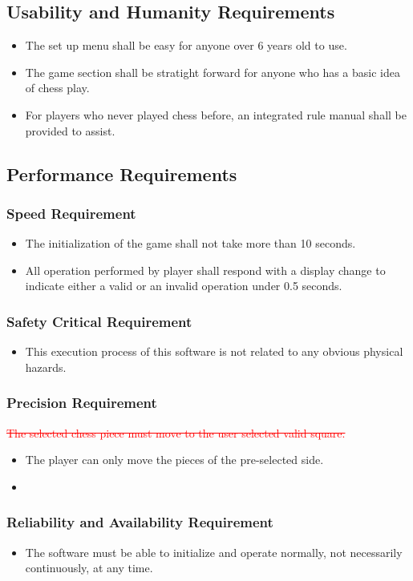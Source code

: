 \documentclass[12pt, titlepage]{article}
\begin{document}
\subsection{Usability and Humanity Requirements}
\begin{itemize}
\item The set up menu shall be easy for anyone over 6 years old to use.
\item The game section shall be stratight forward for anyone who has a basic idea of chess play.
\item For players who never played chess before, an integrated rule manual shall be provided to assist.
\end{itemize}
\subsection{Performance Requirements}
\subsubsection{Speed Requirement}
\begin{itemize}
\item The initialization of the game shall not take more than 10 seconds.
\item All operation performed by player shall respond with a display change to indicate either a valid or an invalid operation under 0.5 seconds.
\end{itemize}
\subsubsection{Safety Critical Requirement}
\begin{itemize}
\item This execution process of this software is not related to any obvious physical hazards.
\end{itemize}
\subsubsection{Precision Requirement}
\textcolor{red}{
\sout{The selected chess piece must move to the user selected valid square.}}
\begin{itemize}
\item The player can only move the pieces of the pre-selected side.
\item \color{red}{The mouse-click input should equivalent to the visual platform.}
\end{itemize}
\subsubsection{Reliability and Availability Requirement}
\begin{itemize}
\item The software must be able to initialize and operate normally, not necessarily continuously, at any time.
\end{itemize}
\end{document}
